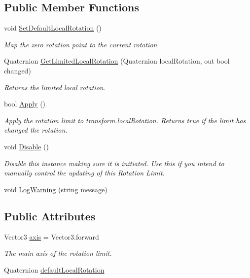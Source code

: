 \subsection*{Public Member Functions}
\begin{DoxyCompactItemize}
\item 
void \mbox{\hyperlink{class_root_motion_1_1_final_i_k_1_1_rotation_limit_a9188ecc002dba532b52bf19bd3056193}{Set\+Default\+Local\+Rotation}} ()
\begin{DoxyCompactList}\small\item\em Map the zero rotation point to the current rotation \end{DoxyCompactList}\item 
Quaternion \mbox{\hyperlink{class_root_motion_1_1_final_i_k_1_1_rotation_limit_a7ea2b2741fcfb3aa5333474acb89e79d}{Get\+Limited\+Local\+Rotation}} (Quaternion local\+Rotation, out bool changed)
\begin{DoxyCompactList}\small\item\em Returns the limited local rotation. \end{DoxyCompactList}\item 
bool \mbox{\hyperlink{class_root_motion_1_1_final_i_k_1_1_rotation_limit_a3b12e3e65a87ae641c537fea1593d02e}{Apply}} ()
\begin{DoxyCompactList}\small\item\em Apply the rotation limit to transform.\+local\+Rotation. Returns true if the limit has changed the rotation. \end{DoxyCompactList}\item 
void \mbox{\hyperlink{class_root_motion_1_1_final_i_k_1_1_rotation_limit_a421593ab0920f61dea2ca91ba16ed602}{Disable}} ()
\begin{DoxyCompactList}\small\item\em Disable this instance making sure it is initiated. Use this if you intend to manually control the updating of this Rotation Limit. \end{DoxyCompactList}\item 
void \mbox{\hyperlink{class_root_motion_1_1_final_i_k_1_1_rotation_limit_aba2c93debdd5f53a0169d0067a6c1454}{Log\+Warning}} (string message)
\end{DoxyCompactItemize}
\subsection*{Public Attributes}
\begin{DoxyCompactItemize}
\item 
Vector3 \mbox{\hyperlink{class_root_motion_1_1_final_i_k_1_1_rotation_limit_a93c11beb22e4e50550bd32284fb8c38b}{axis}} = Vector3.\+forward
\begin{DoxyCompactList}\small\item\em The main axis of the rotation limit. \end{DoxyCompactList}\item 
Quaternion \mbox{\hyperlink{class_root_motion_1_1_final_i_k_1_1_rotation_limit_a9e23ef7de234d8f5b8d387bede241087}{default\+Local\+Rotation}}
\end{DoxyCompactItemize}
